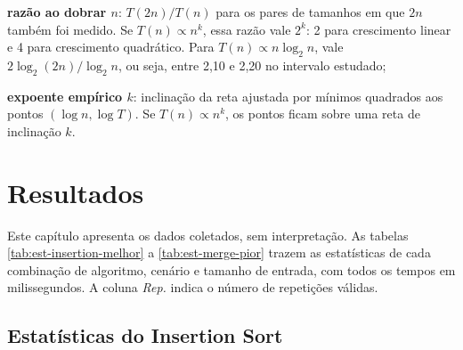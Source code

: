 \documentclass[
    12pt,
    oneside,
    a4paper,
    openany,
    chapter=TITLE,
    english,
    brazil
]{abntex2}
\begin{document}
\begin{alineas}
    \item \textbf{razão ao dobrar $n$}: $T(2n)/T(n)$ para os pares de tamanhos em que $2n$ também foi medido. Se $T(n) \propto n^k$, essa razão vale $2^k$: 2 para crescimento linear e 4 para crescimento quadrático. Para $T(n) \propto n \log_2 n$, vale $2 \log_2(2n) / \log_2 n$, ou seja, entre 2,10 e 2,20 no intervalo estudado;
    \item \textbf{expoente empírico $k$}: inclinação da reta ajustada por mínimos quadrados aos pontos $(\log n, \log T)$. Se $T(n) \propto n^k$, os pontos ficam sobre uma reta de inclinação $k$.
\end{alineas}

\chapter{Resultados}
\label{cap:resultados}

Este capítulo apresenta os dados coletados, sem interpretação. As tabelas \ref{tab:est-insertion-melhor} a \ref{tab:est-merge-pior} trazem as estatísticas de cada combinação de algoritmo, cenário e tamanho de entrada, com todos os tempos em milissegundos. A coluna \emph{Rep.} indica o número de repetições válidas.

\section{Estatísticas do Insertion Sort}

\begin{table}[H]
    \caption{Insertion Sort, melhor caso: estatísticas do tempo de execução (ms)}
    \label{tab:est-insertion-melhor}
    \centering
    \small
    
\end{table}

\begin{table}[H]
    \caption{Insertion Sort, caso médio: estatísticas do tempo de execução (ms)}
    \label{tab:est-insertion-medio}
    \centering
    \small
    
\end{table}

\begin{table}[H]
    \caption{Insertion Sort, pior caso: estatísticas do tempo de execução (ms)}
    \label{tab:est-insertion-pior}
    \centering
    \small
    
\end{table}
\end{document}
